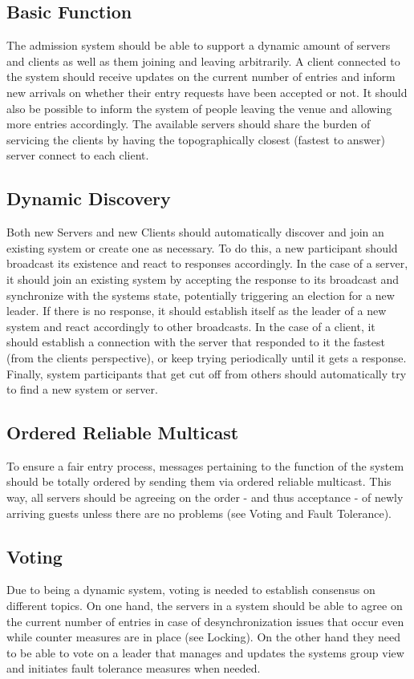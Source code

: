 \documentclass[runningheads]{llncs}
\begin{document}
\subsection{Basic Function}
The admission system should be able to support a dynamic amount of servers and clients as well as them joining and leaving arbitrarily.
A client connected to the system should receive updates on the current number of entries and inform new arrivals on whether their entry requests have been accepted or not.
It should also be possible to inform the system of people leaving the venue and allowing more entries accordingly.
The available servers should share the burden of servicing the clients by having the topographically closest (fastest to answer) server connect to each client.

\subsection{Dynamic Discovery} \label{dyndisc}
Both new Servers and new Clients should automatically discover and join an existing system or create one as necessary.
To do this, a new participant should broadcast its existence and react to responses accordingly.
In the case of a server, it should join an existing system by accepting the response to its broadcast and synchronize with the systems state, potentially triggering an election for a new leader.
If there is no response, it should establish itself as the leader of a new system and react accordingly to other broadcasts.
In the case of a client, it should establish a connection with the server that responded to it the fastest (from the clients perspective), or keep trying periodically until it gets a response.
Finally, system participants that get cut off from others should automatically try to find a new system or server.

\subsection{Ordered Reliable Multicast}
To ensure a fair entry process, messages pertaining to the function of the system should be totally ordered by sending them via ordered reliable multicast.
This way, all servers should be agreeing on the order - and thus acceptance - of newly arriving guests unless there are no problems (see Voting and Fault Tolerance).

\subsection{Voting}
Due to being a dynamic system, voting is needed to establish consensus on different topics.
On one hand, the servers in a system should be able to agree on the current number of entries in case of desynchronization issues that occur even while counter measures are in place (see Locking).
On the other hand they need to be able to vote on a leader that manages and updates the systems group view and initiates fault tolerance measures when needed.
\end{document}
